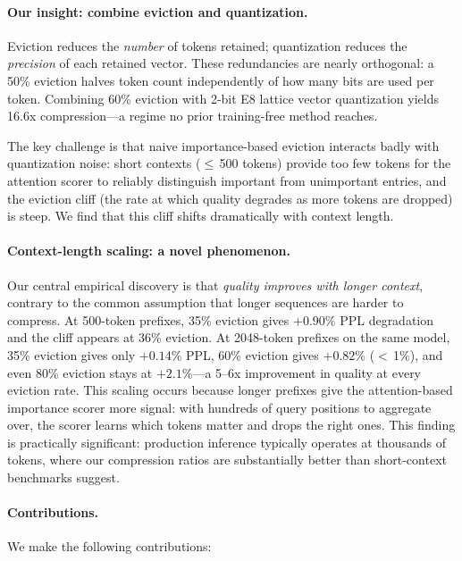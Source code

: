 \paragraph{Our insight: combine eviction and quantization.}
Eviction reduces the \emph{number} of tokens retained; quantization reduces
the \emph{precision} of each retained vector. These redundancies are nearly
orthogonal: a 50\% eviction halves token count independently of how many bits
are used per token. Combining 60\% eviction with 2-bit E8 lattice vector
quantization yields 16.6x compression---a regime no prior training-free
method reaches.

The key challenge is that naive importance-based eviction interacts badly with
quantization noise: short contexts ($\le$\,500 tokens) provide too few tokens
for the attention scorer to reliably distinguish important from unimportant
entries, and the eviction cliff (the rate at which quality degrades as more
tokens are dropped) is steep. We find that this cliff shifts dramatically with
context length.

\paragraph{Context-length scaling: a novel phenomenon.}
Our central empirical discovery is that \emph{quality improves with longer
context}, contrary to the common assumption that longer sequences are harder to
compress. At 500-token prefixes, 35\% eviction gives $+0.90\%$ PPL degradation
and the cliff appears at 36\% eviction. At 2048-token prefixes on the same
model, 35\% eviction gives only $+0.14\%$ PPL, 60\% eviction gives $+0.82\%$
($<$\,1\%), and even 80\% eviction stays at $+2.1\%$---a 5--6x improvement in
quality at every eviction rate. This scaling occurs because longer prefixes
give the attention-based importance scorer more signal: with hundreds of query
positions to aggregate over, the scorer learns which tokens matter and drops
the right ones. This finding is practically significant: production inference
typically operates at thousands of tokens, where our compression ratios are
substantially better than short-context benchmarks suggest.

\paragraph{Contributions.}
We make the following contributions:


